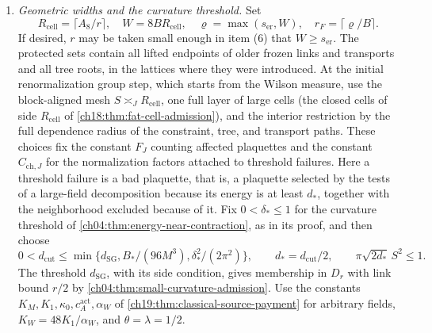 \begin{theorem}
\begin{enumerate}[label=(\arabic*)]
\item \emph{Geometric widths and the curvature threshold.} Set
\[
 R_{\mathrm{cell}}=\lceil A_8/r\rceil,\quad W=8BR_{\mathrm{cell}},\quad \varrho=\max(s_{\mathrm{er}},W),\quad r_F=\lceil\varrho/B\rceil.
\]
If desired, $r$ may be taken small enough in item \textup{(6)} that $W\ge s_{\mathrm{er}}$. The protected sets contain all lifted endpoints of older frozen links and transports and all tree roots, in the lattices where they were introduced. At the initial renormalization group step, which starts from the Wilson measure, use the block-aligned mesh $S\asymp_JR_{\mathrm{cell}}$, one full layer of large cells (the closed cells of side $R_{\mathrm{cell}}$ of \cref{ch18:thm:fat-cell-admission}), and the interior restriction by the full dependence radius of the constraint, tree, and transport paths. These choices fix the constant $F_J$ counting affected plaquettes and the constant $C_{\mathrm{ch},J}$ for the normalization factors attached to threshold failures. Here a threshold failure is a bad plaquette, that is, a plaquette selected by the tests of a large-field decomposition because its energy is at least $d_*$, together with the neighborhood excluded because of it. Fix $0<\delta_*\le1$ for the curvature threshold of \cref{ch04:thm:energy-near-contraction}, as in its proof, and then choose
\[
 0<d_{\mathrm{cut}}\le\min\{d_{\mathrm{SG}},B_*/(96M^3),\delta_*^2/(2\pi^2)\},\qquad
 d_*=d_{\mathrm{cut}}/2,\qquad \pi\sqrt{2d_*}\,S^2\le1.
\]
The threshold $d_{\mathrm{SG}}$, with its side condition, gives membership in $D_r$ with link bound $r/2$ by \cref{ch04:thm:small-curvature-admission}. Use the constants $K_M,K_1,\kappa_0,c_A^{\mathrm{act}},\alpha_W$ of \cref{ch19:thm:classical-source-payment} for arbitrary fields, $K_W=48K_1/\alpha_W$, and $\theta=\lambda=1/2$.


\end{enumerate}
\end{theorem}
